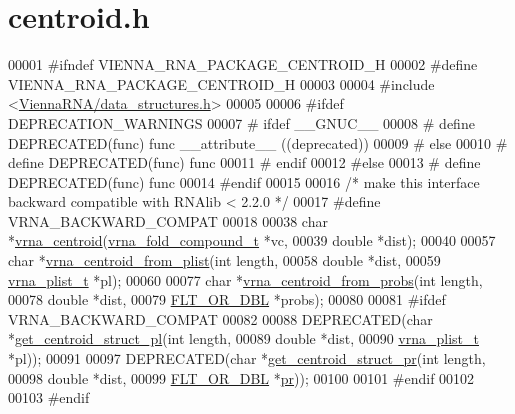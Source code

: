 \hypertarget{centroid_8h_source}{}\section{centroid.\+h}
\label{centroid_8h_source}

\begin{DoxyCode}
00001 \textcolor{preprocessor}{#ifndef VIENNA\_RNA\_PACKAGE\_CENTROID\_H}
00002 \textcolor{preprocessor}{#define VIENNA\_RNA\_PACKAGE\_CENTROID\_H}
00003 
00004 \textcolor{preprocessor}{#include <\hyperlink{data__structures_8h}{ViennaRNA/data\_structures.h}>}
00005 
00006 \textcolor{preprocessor}{#ifdef DEPRECATION\_WARNINGS}
00007 \textcolor{preprocessor}{# ifdef \_\_GNUC\_\_}
00008 \textcolor{preprocessor}{#  define DEPRECATED(func) func \_\_attribute\_\_ ((deprecated))}
00009 \textcolor{preprocessor}{# else}
00010 \textcolor{preprocessor}{#  define DEPRECATED(func) func}
00011 \textcolor{preprocessor}{# endif}
00012 \textcolor{preprocessor}{#else}
00013 \textcolor{preprocessor}{# define DEPRECATED(func) func}
00014 \textcolor{preprocessor}{#endif}
00015 
00016 \textcolor{comment}{/* make this interface backward compatible with RNAlib < 2.2.0 */}
00017 \textcolor{preprocessor}{#define VRNA\_BACKWARD\_COMPAT}
00018 
00038 \textcolor{keywordtype}{char} *\hyperlink{group__centroid__fold_ga0e64bb67e51963dc71cbd4d30b80a018}{vrna\_centroid}(\hyperlink{group__fold__compound_structvrna__fc__s}{vrna\_fold\_compound\_t} *vc,
00039                     \textcolor{keywordtype}{double} *dist);
00040 
00057 \textcolor{keywordtype}{char}  *\hyperlink{group__centroid__fold_ga70525a53b879c1427f9ea546c96fa1c5}{vrna\_centroid\_from\_plist}(\textcolor{keywordtype}{int} length,
00058                                 \textcolor{keywordtype}{double} *dist,
00059                                 \hyperlink{group__data__structures_structvrna__plist__s}{vrna\_plist\_t} *pl);
00060 
00077 \textcolor{keywordtype}{char}  *\hyperlink{group__centroid__fold_ga98193ede06778a9ea966cc8fc43d0804}{vrna\_centroid\_from\_probs}(\textcolor{keywordtype}{int} length,
00078                                 \textcolor{keywordtype}{double} *dist,
00079                                 \hyperlink{group__data__structures_ga31125aeace516926bf7f251f759b6126}{FLT\_OR\_DBL} *probs);
00080 
00081 \textcolor{preprocessor}{#ifdef VRNA\_BACKWARD\_COMPAT}
00082 
00088 DEPRECATED(\textcolor{keywordtype}{char}  *\hyperlink{centroid_8h_a8f387bf1583fb5eaf5f4ffd78493e43e}{get\_centroid\_struct\_pl}(\textcolor{keywordtype}{int} length,
00089                               \textcolor{keywordtype}{double} *dist,
00090                               \hyperlink{group__data__structures_structvrna__plist__s}{vrna\_plist\_t} *pl));
00091 
00097 DEPRECATED(\textcolor{keywordtype}{char}  *\hyperlink{centroid_8h_ac92486ce514677256f4a832dc518759c}{get\_centroid\_struct\_pr}(\textcolor{keywordtype}{int} length,
00098                               \textcolor{keywordtype}{double} *dist,
00099                               \hyperlink{group__data__structures_ga31125aeace516926bf7f251f759b6126}{FLT\_OR\_DBL} *\hyperlink{fold__vars_8h_ac98ec419070aee6831b44e5c700f090f}{pr}));
00100 
00101 \textcolor{preprocessor}{#endif}
00102 
00103 \textcolor{preprocessor}{#endif}
\end{DoxyCode}
